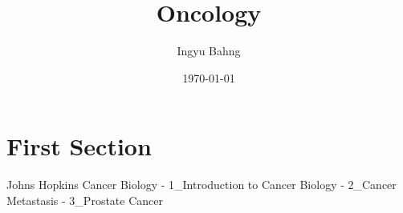 \documentclass[10pt]{article}
\title{Oncology}
\date{\today}
\author{Ingyu Bahng}
\begin{document}


\section{First Section}

Johns Hopkins Cancer Biology
- 1_Introduction to Cancer Biology
- 2_Cancer Metastasis
- 3_Prostate Cancer
  
\end{document}
